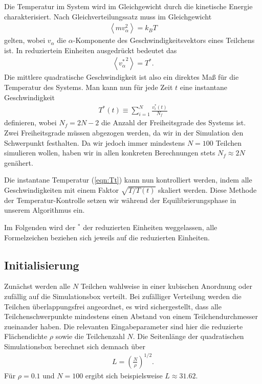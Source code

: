 \documentclass[11pt,a4paper]{article}
\begin{document}
Die Temperatur im System wird im Gleichgewicht durch die kinetische Energie charakterisiert. Nach Gleichverteilungssatz muss im Gleichgewicht 
\begin{align}
	\left\langle m v_{\alpha}^2 \right\rangle = k_B T
\end{align}
gelten, wobei $v_{\alpha}$ die $\alpha$-Komponente des Geschwindigkeitsvektors eines Teilchens ist. In reduziertein Einheiten ausgedrückt bedeutet das
\begin{align}
	\left\langle {v^*_{\alpha}}^2 \right\rangle = T^*.
\end{align}
Die mittlere quadratische Geschwindigkeit ist also ein direktes Maß für die Temperatur des Systems. Man kann nun für jede Zeit $t$ eine instantane Geschwindigkeit 
\begin{align}
	T^*(t) \equiv \sum_{i=1}^{N} \frac{v^*_i(t)}{N_f} \label{eqn:Tt}
\end{align}
definieren, wobei $N_f = 2N - 2$ die Anzahl der Freiheitsgrade des Systems ist. Zwei Freiheitsgrade müssen abgezogen werden, da wir in der Simulation den Schwerpunkt festhalten. Da wir jedoch immer mindestens $N=100$ Teilchen simulieren wollen, haben wir in allen konkreten Berechnungen stets $N_f \approx 2N$ genähert.

Die instantane Temperatur (\ref{eqn:Tt}) kann nun kontrolliert werden, indem alle Geschwindigkeiten mit einem Faktor $\sqrt{ T/T(t)}$ skaliert werden. Diese Methode der Temperatur-Kontrolle setzen wir während der Equilibrierungsphase in unserem Algorithmus ein.

Im Folgenden wird der $^*$ der reduzierten Einheiten weggelassen, alle Formelzeichen beziehen sich jeweils auf die reduzierten Einheiten.

\subsection{Initialisierung} %
\label{sub:initialisierung}
Zunächst werden alle $N$ Teilchen wahlweise in einer kubischen Anordnung oder zufällig auf die Simulationsbox verteilt. Bei zufälliger Verteilung werden die Teilchen überlappungsfrei angeordnet, \dH es wird sichergestellt, dass alle Teilchenschwerpunkte mindestens einen Abstand von einem Teilchendurchmesser zueinander haben. Die relevanten Eingabeparameter sind hier die reduzierte Flächendichte $\rho$ sowie die Teilchenzahl $N$. Die Seitenlänge der quadratischen Simulationsbox berechnet sich demnach über
\begin{align*}
	L = \left( \frac{N}{\rho} \right)^{1/2}.
\end{align*}
Für $\rho = 0.1$ und $N = 100$ ergibt sich beispielsweise $L \approx 31.62$.
\end{document}

